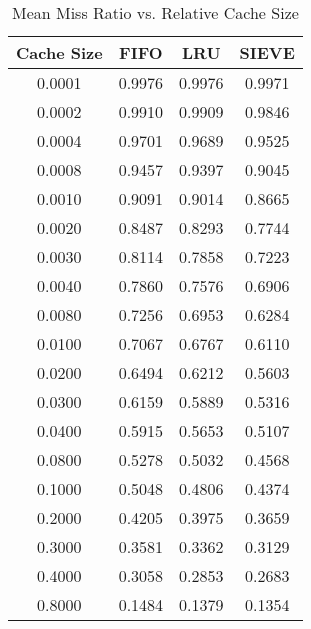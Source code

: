 \begin{table}[h!]
    \centering
    \caption{Mean Miss Ratio vs. Relative Cache Size}
    \label{tab:miss_ratio_data}
    \begin{tabular}{cccc}
        \toprule
        \textbf{Cache Size} & \textbf{FIFO} & \textbf{LRU} & \textbf{SIEVE} \\
        \midrule
        0.0001 & 0.9976 & 0.9976 & 0.9971 \\
        0.0002 & 0.9910 & 0.9909 & 0.9846 \\
        0.0004 & 0.9701 & 0.9689 & 0.9525 \\
        0.0008 & 0.9457 & 0.9397 & 0.9045 \\
        0.0010 & 0.9091 & 0.9014 & 0.8665 \\
        0.0020 & 0.8487 & 0.8293 & 0.7744 \\
        0.0030 & 0.8114 & 0.7858 & 0.7223 \\
        0.0040 & 0.7860 & 0.7576 & 0.6906 \\
        0.0080 & 0.7256 & 0.6953 & 0.6284 \\
        0.0100 & 0.7067 & 0.6767 & 0.6110 \\
        0.0200 & 0.6494 & 0.6212 & 0.5603 \\
        0.0300 & 0.6159 & 0.5889 & 0.5316 \\
        0.0400 & 0.5915 & 0.5653 & 0.5107 \\
        0.0800 & 0.5278 & 0.5032 & 0.4568 \\
        0.1000 & 0.5048 & 0.4806 & 0.4374 \\
        0.2000 & 0.4205 & 0.3975 & 0.3659 \\
        0.3000 & 0.3581 & 0.3362 & 0.3129 \\
        0.4000 & 0.3058 & 0.2853 & 0.2683 \\
        0.8000 & 0.1484 & 0.1379 & 0.1354 \\
        \bottomrule
    \end{tabular}
\end{table}